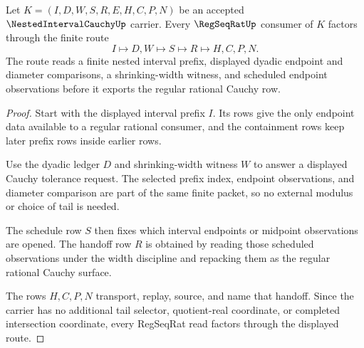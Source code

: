 \begin{theorem}
\label{thm:nested-interval-cauchy-regseqrat-handoff}
Let $K=(I,D,W,S,R,E,H,C,P,N)$ be an accepted $\NestedIntervalCauchyUp$ carrier. Every $\RegSeqRatUp$ consumer of $K$ factors through the finite route
$$
I
\longmapsto
D,W
\longmapsto
S
\longmapsto
R
\longmapsto
H,C,P,N .
$$
The route reads a finite nested interval prefix, displayed dyadic endpoint and diameter comparisons, a shrinking-width witness, and scheduled endpoint observations before it exports the regular rational Cauchy row.
\end{theorem}
\begin{proof}
Start with the displayed interval prefix $I$. Its rows give the only endpoint data available to a regular rational consumer, and the containment rows keep later prefix rows inside earlier rows.

Use the dyadic ledger $D$ and shrinking-width witness $W$ to answer a displayed Cauchy tolerance request. The selected prefix index, endpoint observations, and diameter comparison are part of the same finite packet, so no external modulus or choice of tail is needed.

The schedule row $S$ then fixes which interval endpoints or midpoint observations are opened. The handoff row $R$ is obtained by reading those scheduled observations under the width discipline and repacking them as the regular rational Cauchy surface.

The rows $H,C,P,N$ transport, replay, source, and name that handoff. Since the carrier has no additional tail selector, quotient-real coordinate, or completed intersection coordinate, every RegSeqRat read factors through the displayed route.
\end{proof}


\begin{closurestatus}{\NestedIntervalCauchyUp}
  \theoryclosure{\seedClosure}
  \formalstatus{\unformalizedV}
\end{closurestatus}
